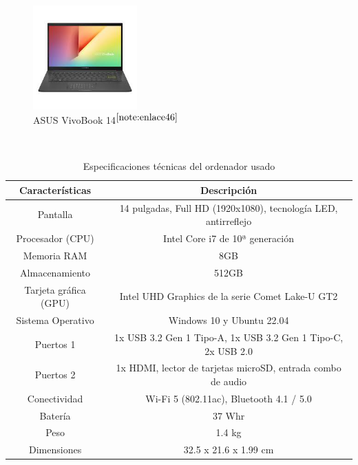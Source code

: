 \begin{figure} [h!]
	\begin{center}
		\includegraphics[width=4cm]{figs/ordenador.png}
	\end{center}
	\caption{ASUS VivoBook 14$^{\ref{note:enlace46}}$} 
	\label{fig:ordenador}
\end{figure}\

\setcounter{footnote}{46} %

\begin{table}[H]
	\begin{center}
		\begin{tabular}{|c|c|}
			\hline
			\textbf{Características} & \textbf{Descripción} \\
			\hline
			Pantalla & 14 pulgadas, Full HD (1920x1080), tecnología LED, antirreflejo \\
			Procesador (CPU) & Intel Core i7 de 10ª generación \\
			Memoria RAM & 8GB \\
			Almacenamiento & 512GB \\
			Tarjeta gráfica (GPU) & Intel UHD Graphics de la serie Comet Lake-U GT2 \\
			Sistema Operativo & Windows 10 y Ubuntu 22.04 \\
			Puertos 1 & 1x USB 3.2 Gen 1 Tipo-A, 1x USB 3.2 Gen 1 Tipo-C, 2x USB 2.0\\  
			Puertos 2 & 1x HDMI, lector de tarjetas microSD, entrada combo de audio \\
			Conectividad & 	Wi-Fi 5 (802.11ac), Bluetooth 4.1 / 5.0 \\
			Batería & 37 Whr \\
			Peso & 1.4 kg \\
			Dimensiones & 32.5 x 21.6 x 1.99 cm \\
			\hline
		\end{tabular}
		\caption{Especificaciones técnicas del ordenador usado}
		\label{cuadro:carac_ordena}
	\end{center}
\end{table}


